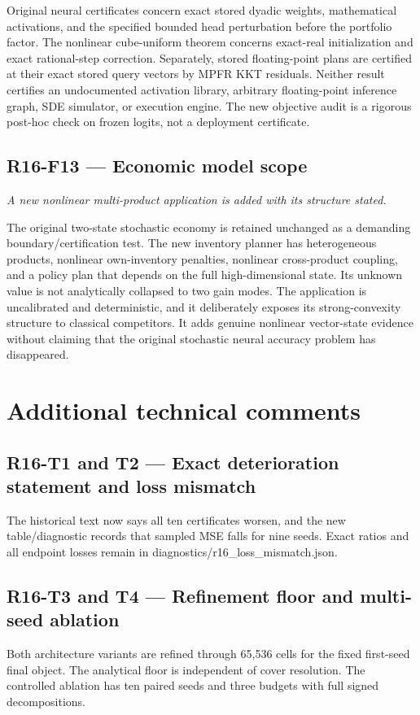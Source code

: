 \documentclass[ecta]{econsocart}
\theoremstyle{remark}
\begin{document}
Original neural certificates concern exact stored dyadic weights, mathematical activations, and the specified bounded head perturbation before the portfolio factor. The nonlinear cube-uniform theorem concerns exact-real initialization and exact rational-step correction. Separately, stored floating-point plans are certified at their exact stored query vectors by MPFR KKT residuals. Neither result certifies an undocumented activation library, arbitrary floating-point inference graph, SDE simulator, or execution engine. The new objective audit is a rigorous post-hoc check on frozen logits, not a deployment certificate.

\subsection{R16-F13 --- Economic model scope}
\noindent\emph{A new nonlinear multi-product application is added with its structure stated.}

The original two-state stochastic economy is retained unchanged as a demanding boundary/certification test. The new inventory planner has heterogeneous products, nonlinear own-inventory penalties, nonlinear cross-product coupling, and a policy plan that depends on the full high-dimensional state. Its unknown value is not analytically collapsed to two gain modes. The application is uncalibrated and deterministic, and it deliberately exposes its strong-convexity structure to classical competitors. It adds genuine nonlinear vector-state evidence without claiming that the original stochastic neural accuracy problem has disappeared.

\section{Additional technical comments}

\subsection{R16-T1 and T2 --- Exact deterioration statement and loss mismatch}
The historical text now says all ten certificates worsen, and the new table/diagnostic records that sampled MSE falls for nine seeds. Exact ratios and all endpoint losses remain in diagnostics/r16\_loss\_mismatch.json.

\subsection{R16-T3 and T4 --- Refinement floor and multi-seed ablation}
Both architecture variants are refined through 65,536 cells for the fixed first-seed final object. The analytical floor is independent of cover resolution. The controlled ablation has ten paired seeds and three budgets with full signed decompositions.
\end{document}
